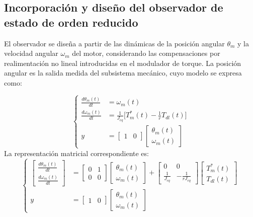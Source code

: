\documentclass[blue,fullpaper]{ludusofficial}  %
\begin{document}

\subsection{Incorporación y diseño del observador de estado de orden reducido}

El observador se diseña a partir de las dinámicas de la posición angular $\theta_{m}$ y la velocidad angular $\omega_{m}$ del motor, considerando las compensaciones por realimentación no lineal introducidas en el modulador de torque. La posición angular es la salida medida del subsistema mecánico, cuyo modelo se expresa como:

\[
\left\{
\begin{aligned}
\frac{d \theta_{m}(t) }{dt} & = \omega_{m}(t) \\
\frac{d \omega_{m}(t) }{dt} & = \frac{1}{J_{eq}} \Big[ T_{m}^{*}(t)-\frac{1}{r}T_{dl}(t) \Big] \\
y & = \begin{bmatrix} 1 & 0 \end{bmatrix} \begin{bmatrix} \theta_{m}(t) \\ \omega_{m}(t) \end{bmatrix}
\end{aligned}
\right.
\]
La representación matricial correspondiente es:
\[
\left\{
\begin{aligned}
\begin{bmatrix} \frac{d \theta_{m}(t) }{dt} \\ \frac{d \omega_{m}(t) }{dt}  \end{bmatrix} 
 & = \begin{bmatrix} 0 & 1 \\0 & 0 \end{bmatrix} \begin{bmatrix} \theta_{m}(t) \\ \omega_{m}(t) \end{bmatrix} + \begin{bmatrix} 0 & 0 \\ \frac{1}{J_{eq}} & -\frac{1}{rJ_{eq}} \end{bmatrix} \begin{bmatrix} T^{*}_{m}(t) \\ T_{dl}(t) \end{bmatrix} \\
y & = \begin{bmatrix} 1 & 0 \end{bmatrix} \begin{bmatrix} \theta_{m}(t) \\ \omega_{m}(t) \end{bmatrix}
\end{aligned}
\right.
\]
\end{document}
